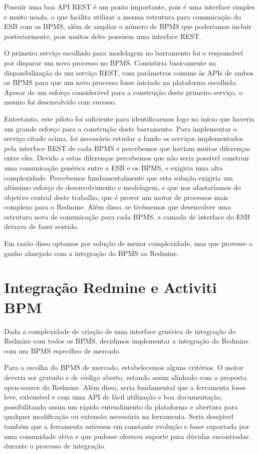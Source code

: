 Possuir uma boa API REST\cite{rest} é um ponto importante, pois é uma interface simples e muito usada, o que facilita utilizar a mesma estrutura para comunicação do ESB com os BPMS, além de ampliar o número de BPMS que poderíamos incluir posteriormente, pois muitos deles possuem uma interface REST.

O primeiro serviço escolhido para modelagem no barramento foi o responsável por disparar um novo processo no BPMS. Consistiria basicamente na disponibilização de um serviço REST, com parâmetros comuns às APIs de ambos os BPMS para que um novo processo fosse iniciado na plataforma escolhida. Apesar de um esforço considerável para a construção deste primeiro serviço, o mesmo foi desenvolvido com sucesso.  

Entretanto, este piloto foi suficiente para identificarmos logo no início que haveria um grande esforço para a construção deste barramento. Para implementar o serviço citado acima, foi necessário estudar a fundo os serviços implementados pela interface REST de cada BPMS e percebemos que haviam muitas diferenças entre eles. Devido a estas diferenças percebemos que não seria possível construir uma comunicação genérica entre o ESB e os BPMS, e exigiria uma alta complexidade. Percebemos fundamentalmente que esta solução exigiria um altíssimo esforço de desenvolvimento e modelagem, e que nos afastaríamos do objetivo central deste trabalho, que é prover um motor de processos mais complexo para o Redmine. Além disso, se tivéssemos que desenvolver uma estrutura nova de comunicação para cada BPMS, a camada de interface do ESB deixava de fazer sentido.

Em razão disso optamos por solução de menor complexidade, mas que provesse o ganho almejado com a integração do BPMS ao Redmine.

\section{Integração Redmine e Activiti BPM}\label{sec:activiti-bpm}

Dada a complexidade de criação de uma interface genérica de integração do Redmine com todos os BPMS, decidimos implementar a integração do Redmine com um BPMS específico de mercado. 

Para a escolha do BPMS de mercado, estabelecemos alguns critérios. O motor deveria ser gratuito e de código aberto, estando assim alinhado com a proposta open-source do Redmine. Além disso, seria fundamental que a ferramenta fosse leve, extensível e com uma API de fácil utilização e boa documentação, possibilitando assim um rápido entendimento da plataforma e abertura para qualquer modificação ou extensão necessária na ferramenta. Seria desejável também que a ferramenta estivesse em constante evolução e fosse suportada por uma comunidade ativa e que pudesse oferecer suporte para dúvidas encontradas durante o processo de integração.

